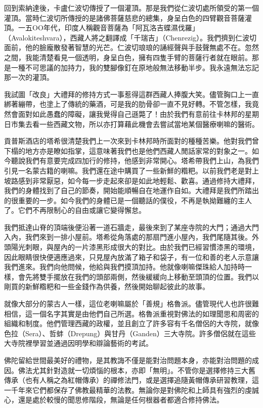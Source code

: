 回到索納達後，卡盧仁波切傳授了一個灌頂。那是我們從仁波切處所領受的第一個灌頂。當時仁波切所傳授的是諸佛菩薩慈悲的總集，身呈白色的四臂觀音菩薩灌頂。一五ΟΟ年代，印度人稱觀音菩薩為「阿瓦洛吉蝶濕伐羅」（Avalokiteshvara），西藏人將之翻譯成「千瑞吉」（Chenrezig）。我們擠到仁波切面前，他的臉龐散發著智慧的光芒。仁波切琅琅的誦經聲與手鼓聲無處不在。忽然之間，我能清楚看見一個透明，身呈白色，擁有四隻手臂的菩薩行者就在眼前。那是一種不可思議的加持力，我的雙腳像釘在原地般無法移動半步。我永遠無法忘記那一次的灌頂。

我試圖「改良」大禮拜的修持方式一事惹得這群西藏人捧腹大笑。儘管胸口上一直綁著繃帶，也塗上了傳統的藥酒，可是我的肋骨卻一直不見好轉。不管怎樣，我竟然會面對如此愚蠢的障礙，讓我覺得自己遜斃了！由於我們有意前往卡林邦的星期日市集去看一些西藏文物，所以亦打算藉此機會去嘗試當地某個醫療喇嘛的醫術。

貢普斯酒店的塔希很清楚我們上一次來到卡林邦時所面對的種種苦樂。他對我們曾下榻的地方亦是瞭如指掌，這意味著我們也是他們西藏人閒話家常的對象之一。如今聽說我們有意要完成四加行的修持，他感到非常開心。塔希帶我們上山，為我們引見一名蒙古籍的喇嘛。我們還在途中購買了一些新鮮的糌粑。以前我們老是對上坡路感到非常厭惡，如今每一步走起來卻是如此地輕鬆、歡喜。通過修持大禮拜，我們的身體找到了自己的節奏，開始能順暢自在地運作自如。大禮拜是我們所踏出的很重要的一步。如今我們的身體已是一個聽話的僕役，不再是執拗難纏的主人了。它們不再限制心的自由或讓它變得懈怠。

我們抵達山脊的頂端後便沿著一道石牆走，最後來到了某座寺院的大門；通過大門入內，我們來到一排小屋前。塔希從角落處的那扇門進小屋內，我們尾隨其後。外頭陽光刺眼，與屋內的一片漆黑形成很大的對比。由於我們已經習慣漆黑的環境，因此眼睛很快便適應過來，只見屋內放滿了箱子和袋子，有一位和善的老人示意讓我們進來。我們向他問候，他給與我們摸頂加持。他就像喇嘛傑珠給人加持時一樣，會先將雙手擺放在我們的頭部兩側，然後緩緩向上移動至頭頂的位置。我們以剛買的新鮮糌粑和一些金錢作為供養，然後開始聊起彼此的故事。

就像大部分的蒙古人一樣，這位老喇嘛屬於「善規」格魯派。儘管現代人也許很難相信，這一個名字其實是由他們自己所選。格魯派重視對佛法的如理聞思和周密的組織和制度。他們管理西藏的政權，並且創立了許多容有千名僧侶的大寺院，就像色拉（Sera）、哲蚌（Drepung）與甘丹（Ganden）三大寺院。許多僧侶就在這些大寺院裡學習並通過因明學和辯論藝術的考試。

佛陀留給世間最美好的禮物，是其教誨不僅是能對治問題本身，亦能對治問題的成因。佛法尤其針對造就一切煩惱的根本，亦即「無明」。不管你是選擇修持三大舊傳承（也有人稱之為紅帽傳承）的禪修法門，或是選擇追隨黃帽傳承研習教理，這一千年來它們都保存了佛教最精華的法教。無論你是對佛陀和上師具有強烈的虔誠心，還是處於較慢的聞思修階段，無論是任何根器者都適合修持佛法。

